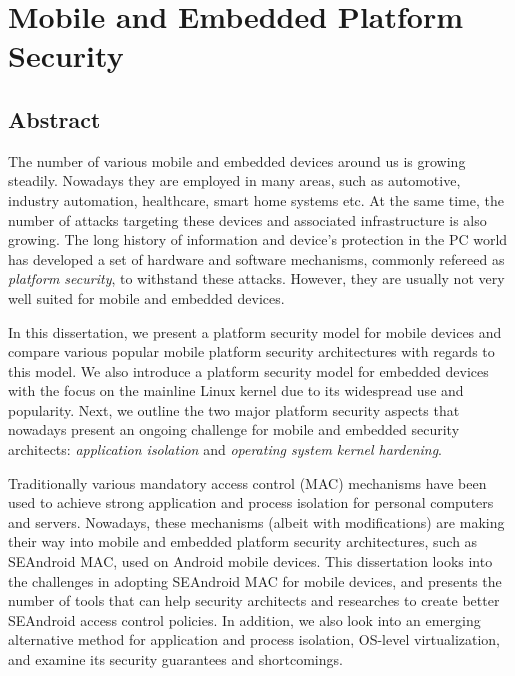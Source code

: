 \chapter*{Mobile and Embedded Platform Security}


\section*{Abstract}

The number of various mobile and embedded devices around us is growing steadily. Nowadays they are employed in many areas, such as automotive, industry automation, healthcare, smart home systems etc. At the same time, the number of attacks targeting these devices and associated infrastructure is also growing. The long history of information and device's protection in the PC world has developed a set of hardware and software mechanisms, commonly refereed as \textit{platform security}, to withstand these attacks. However, they are usually not very well suited for mobile and embedded devices. 

In this dissertation, we present a platform security model for mobile devices and compare various popular mobile platform security architectures with regards to this model. We also introduce a platform security model for embedded devices with the focus on the mainline Linux kernel due to its widespread use and popularity. Next, we outline the two major platform security aspects that nowadays present an ongoing challenge for mobile and embedded security architects: \textit{application isolation} and \textit{operating system kernel hardening}.   

Traditionally various mandatory access control (MAC) mechanisms have been used to achieve strong application and process isolation for personal computers and servers. Nowadays, these mechanisms (albeit with modifications) are making their way into mobile and embedded platform security architectures, such as SEAndroid MAC, used on Android mobile devices. This dissertation looks into the challenges in adopting SEAndroid MAC for mobile devices, and presents the number of tools that can help security architects and researches to create better SEAndroid access control policies. In addition, we also look into an emerging alternative method for application and process isolation, OS-level virtualization, and examine its security guarantees and shortcomings. 

